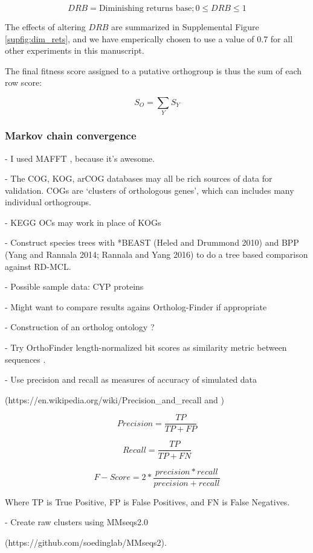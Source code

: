 \documentclass[twocolumn]{bmcart}%
\begin{document}
\[ DRB = \text{Diminishing returns base}; 0 \leq DRB \leq 1 \]

The effects of altering $DRB$ are summarized in Supplemental Figure \ref{supfig:dim_rets}, and we have emperically chosen to use a value of 0.7 for all other experiments in this manuscript.

The final fitness score assigned to a putative orthogroup is thus the sum of each row score:

\[ S_O = \sum_{Y} S_Y \]


\subsubsection*{Markov chain convergence}


- I used MAFFT \cite{Katoh:2013hm}, because it's awesome.

- The COG, KOG, arCOG databases may all be rich sources of data for validation. COGs are `clusters of orthologous genes', which can includes many individual orthogroups.

- KEGG OCs may work in place of KOGs \cite{Nakaya:2013gg}

- Construct species trees with *BEAST (Heled and Drummond 2010) and BPP (Yang and Rannala 2014; Rannala and Yang 2016) to do a tree based comparison against RD-MCL.

- Possible sample data: CYP proteins \cite{Pan:2016jg}

- Might want to compare results agains Ortholog-Finder if appropriate \cite{Horiike:2016dq}

- Construction of an ortholog ontology \cite{Chiba:2015ed}?

- Try OrthoFinder length-normalized bit scores as similarity metric between sequences \cite{Emms:2015ig}.

- Use precision and recall as measures of accuracy of simulated data

(https://en.wikipedia.org/wiki/Precision\_and\_recall and \cite{Emms:2015ig})

\[ Precision = \frac{TP}{TP + FP} \]

\[ Recall = \frac{TP}{TP + FN} \]

\[ F-Score = 2 * \frac{precision * recall}{precision + recall} \]

Where TP is True Positive, FP is False Positives, and FN is False Negatives.

- Create raw clusters using MMseqs2.0

(https://github.com/soedinglab/MMseqs2).
\end{document}
